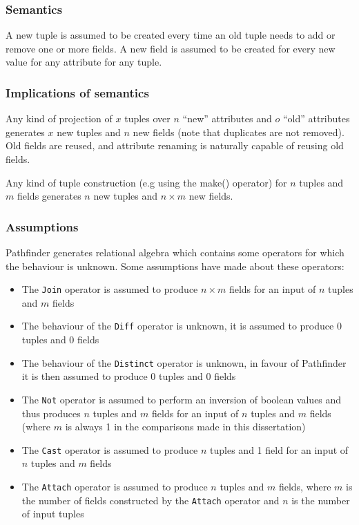 \subsubsection{Semantics}
A new tuple is assumed to be created every time an old tuple needs to add or
remove one or more fields. A new field is assumed to be created for every new
value for any attribute for any tuple.

\subsubsection{Implications of semantics}
Any kind of projection of $x$ tuples over $n$ ``new'' attributes and $o$
``old'' attributes generates $x$ new tuples and $n$ new fields (note that
duplicates are not removed). Old fields are reused, and attribute renaming
is naturally capable of reusing old fields.

Any kind of tuple construction (e.g using the \textsf{make()} operator)
for $n$ tuples and $m$ fields generates $n$ new tuples and $n \times m$ new
fields.

\subsubsection{Assumptions}
\label{sect:method:complexity:assumptions}
Pathfinder generates relational algebra which contains some operators for which
the behaviour is unknown. Some assumptions have made about these operators:
\begin{itemize}
  \item The \texttt{Join} operator is assumed to produce $n \times m$ fields for
  an input of $n$ tuples and $m$ fields
  \item The behaviour of the \texttt{Diff} operator is unknown, it is assumed
  to produce 0 tuples and 0 fields
  \item The behaviour of the \texttt{Distinct} operator is unknown, in favour
  of Pathfinder it is then assumed to produce 0 tuples and 0 fields
  \item The \texttt{Not} operator is assumed to perform an inversion of boolean
  values and thus produces $n$ tuples and $m$ fields for an input of $n$ tuples
  and $m$ fields (where $m$ is always 1 in the comparisons made in this dissertation)
  \item The \texttt{Cast} operator is assumed to produce $n$ tuples and 1
  field for an input of $n$ tuples and $m$ fields
  \item The \texttt{Attach} operator is assumed to produce $n$ tuples and $m$
  fields, where $m$ is the number of fields constructed by the \texttt{Attach}
  operator and $n$ is the number of input tuples
\end{itemize}

